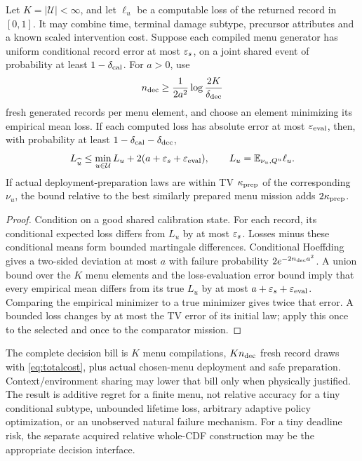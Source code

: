 \begin{corollary}\label{cor:decision}
Let $K=|\mathcal U|<\infty$, and let $\ell_u$ be a computable loss of the
returned record in $[0,1]$. It may combine time, terminal damage subtype,
precursor attributes and a known scaled intervention cost. Suppose each
compiled menu generator has uniform conditional record error at most
$\varepsilon_s$, on a joint shared event of probability at least $1-\delta_{\rm cal}$.
For $a>0$, use
\[
 n_{\rm dec}\ge \frac{1}{2a^2}\log\frac{2K}{\delta_{\rm dec}}
\]
fresh generated records per menu element, and choose an element minimizing
its empirical mean loss. If each computed loss has absolute error at most
$\varepsilon_{\rm eval}$, then, with probability at least
$1-\delta_{\rm cal}-\delta_{\rm dec}$,
\[
 L_{\widehat u}\le\min_{u\in\mathcal U} L_u+
                  2(a+\varepsilon_s+\varepsilon_{\rm eval}),
 \qquad L_u=\mathbb E_{\nu_u,Q^u}\ell_u .
\]
If actual deployment-preparation laws are within TV $\kappa_{\rm prep}$ of
the corresponding $\nu_u$, the bound relative to the best similarly
prepared menu mission adds $2\kappa_{\rm prep}$.
\end{corollary}
\begin{proof}
Condition on a good shared calibration state. For each record, its
conditional expected loss differs from $L_u$ by at most $\varepsilon_s$.
Losses minus these conditional means form bounded martingale differences.
Conditional Hoeffding gives a two-sided deviation at most $a$ with failure
probability $2e^{-2n_{\rm dec}a^2}$. A union bound over the $K$ menu elements
and the loss-evaluation error bound imply that every empirical mean
differs from its true $L_u$ by at most $a+\varepsilon_s+\varepsilon_{\rm eval}$.
Comparing the empirical minimizer to a true minimizer gives twice that
error. A bounded loss changes by at most the TV error of its initial law;
apply this once to the selected and once to the comparator mission.
\end{proof}

The complete decision bill is $K$ menu compilations, $Kn_{\rm dec}$ fresh
record draws with \eqref{eq:totalcost}, plus actual chosen-menu deployment
and safe preparation. Context/environment sharing may lower that bill
only when physically justified. The result is additive regret for a
finite menu, not relative accuracy for a tiny conditional subtype,
unbounded lifetime loss, arbitrary adaptive policy optimization, or an
unobserved natural failure mechanism. For a tiny deadline risk, the
separate acquired relative whole-CDF construction may be the appropriate
decision interface.


